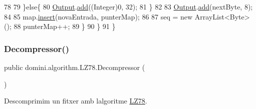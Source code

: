\begin{DoxyCode}
78 
79                 \}\textcolor{keywordflow}{else}\{
80                     \hyperlink{classdomini_1_1algorithm_1_1Algorithm_a4de9955411c656325adc391ef570c082}{Output}.\hyperlink{classpersistencia_1_1output_1_1Ctrl__Output_a8c5aa5a6acb5259faeb1c05c71ddd21c}{add}((Integer)0, 32);
81                 \}
82                 
83                 \hyperlink{classdomini_1_1algorithm_1_1Algorithm_a4de9955411c656325adc391ef570c082}{Output}.\hyperlink{classpersistencia_1_1output_1_1Ctrl__Output_a8c5aa5a6acb5259faeb1c05c71ddd21c}{add}(nextByte, 8);
84 
85                 map.\hyperlink{classdomini_1_1utils_1_1Trie_a3599001d9b056f0b54ab7eabb9d3510b}{insert}(novaEntrada, punterMap);
86 
87                 seq = \textcolor{keyword}{new} ArrayList<Byte>();
88                 punterMap++;
89             \}
90         \}
91     \}
\end{DoxyCode}
\mbox{\label{classdomini_1_1algorithm_1_1LZ78_a0872cb8224ffd478b992490df06f6ecf}} 
\subsubsection{\texorpdfstring{Decompressor()}{Decompressor()}}
{\footnotesize\ttfamily public domini.\+algorithm.\+L\+Z78.\+Decompressor (\begin{DoxyParamCaption}{ }\end{DoxyParamCaption})\hspace{0.3cm}{\ttfamily [inline]}}



Descomprimim un fitxer amb l\textquotesingle{}algoritme \hyperlink{classdomini_1_1algorithm_1_1LZ78}{L\+Z78}. 


